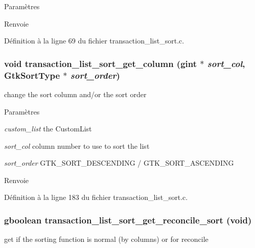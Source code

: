 \begin{DoxyParams}{Paramètres}
\item[{\em }]\end{DoxyParams}
\begin{DoxyReturn}{Renvoie}

\end{DoxyReturn}


Définition à la ligne 69 du fichier transaction\_\-list\_\-sort.c.

\subsubsection[{transaction\_\-list\_\-sort\_\-get\_\-column}]{\setlength{\rightskip}{0pt plus 5cm}void transaction\_\-list\_\-sort\_\-get\_\-column (gint $\ast$ {\em sort\_\-col}, \/  GtkSortType $\ast$ {\em sort\_\-order})}\label{transaction__list__sort_8h_ae3160f04fcf15af961324f65b9759799}
change the sort column and/or the sort order


\begin{DoxyParams}{Paramètres}
\item[{\em custom\_\-list}]the CustomList \item[{\em sort\_\-col}]column number to use to sort the list \item[{\em sort\_\-order}]GTK\_\-SORT\_\-DESCENDING / GTK\_\-SORT\_\-ASCENDING\end{DoxyParams}
\begin{DoxyReturn}{Renvoie}

\end{DoxyReturn}


Définition à la ligne 183 du fichier transaction\_\-list\_\-sort.c.

\subsubsection[{transaction\_\-list\_\-sort\_\-get\_\-reconcile\_\-sort}]{\setlength{\rightskip}{0pt plus 5cm}gboolean transaction\_\-list\_\-sort\_\-get\_\-reconcile\_\-sort (void)}\label{transaction__list__sort_8h_a436b2ef3d8acb82f320e2b9fe2e6c8c6}
get if the sorting function is normal (by columns) or for reconcile


